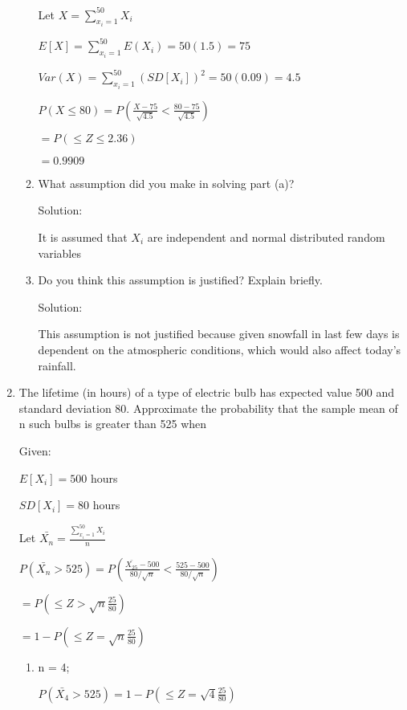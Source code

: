 \documentclass{article}
\begin{document}
\begin{enumerate}
\begin{enumerate}
        Let $X = \displaystyle \sum_{x_i = 1}^{50} {X_i} $

        $E[X] = \displaystyle \sum_{x_i = 1}^{50} {E(X_i)} = 50(1.5) = 75$

        $Var(X) = \displaystyle \sum_{x_i = 1}^{50} {(SD[X_i])^2 = 50(0.09) = 4.5}$
    
        $\displaystyle P(X \leq 80) = P\left(\frac{X - 75}{\sqrt{4.5}}<\frac{80 - 75}{\sqrt{4.5}}\right)$

        $= \displaystyle P\left(\leq Z \leq 2.36 \right)$
    
        $=0.9909$
        \item What assumption did you make in solving part (a)?
        
        Solution:

        It is assumed that $X_i$ are independent and normal distributed random variables
        
        \item Do you think this assumption is justified? Explain briefly.
        
        Solution:

        This assumption is not justified because given snowfall in last few days is dependent on the atmospheric conditions, which would also affect today's rainfall.
    \end{enumerate}
    \item  The lifetime (in hours) of a type of electric bulb has expected value 500 and standard deviation 80. 
    Approximate the probability that the sample mean of n such bulbs is greater than 525 when
       
    Given:

        $E[X_i] = 500$ hours

        $SD[X_i] = 80$ hours

        Let $\bar{X_n} = \displaystyle \frac{\sum_{x_i = 1}^{50} {X_i}}{n}$
    
        $\displaystyle P(\bar{X_n} > 525) = P\left(\frac{\bar{X_{25}} - 500}{80/\sqrt{n}}<\frac{525 - 500}{80/\sqrt{n}}\right)$

        $= \displaystyle P\left(\leq Z > \sqrt{n}\frac{25}{80}\right)$
    
        $=1 - P\left(\leq Z = \sqrt{n}\frac{25}{80}\right)$

    \begin{enumerate}
        \item n = 4;

         $\displaystyle P(\bar{X_4} > 525) = 1 - P\left(\leq Z = \sqrt{4}\frac{25}{80}\right)$
         

\end{enumerate}
\end{enumerate}
\end{document}
